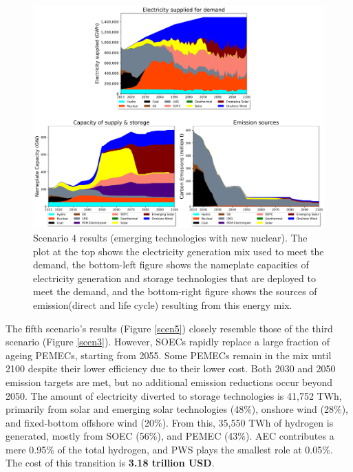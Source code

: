 \begin{figure}[b!] 
\centering
\includegraphics[scale=0.5]{figures/newtechs_nuc}
\caption{Scenario 4 results (emerging technologies with new nuclear). The plot at the top shows the electricity generation mix used to meet the demand, the bottom-left figure shows the nameplate capacities of electricity generation and storage technologies that are deployed to meet the demand, and the bottom-right figure shows the sources of emission(direct and life cycle) resulting from this energy mix.}
\label{scen4}
\end{figure}

The fifth scenario's results (Figure \ref{scen5}) closely resemble those of the third scenario (Figure \ref{scen3}). However, \gls{SOEC}s rapidly replace a large fraction of ageing \gls{PEMEC}s, starting from 2055. Some \gls{PEMEC}s remain in the mix until 2100 despite their lower efficiency due to their lower cost. Both 2030 and 2050 emission targets are met, but no additional emission reductions occur beyond 2050. The amount of electricity diverted to storage technologies is 41,752 TWh, primarily from solar and emerging solar technologies (48\%), onshore wind (28\%), and fixed-bottom offshore wind (20\%). From this, 35,550 TWh of hydrogen is generated, mostly from \gls{SOEC} (56\%), and \gls{PEMEC} (43\%). \gls{AEC} contributes a mere 0.95\% of the total hydrogen, and \gls{PWS} plays the smallest role at 0.05\%. The cost of this transition is \textbf{3.18 trillion USD}.

